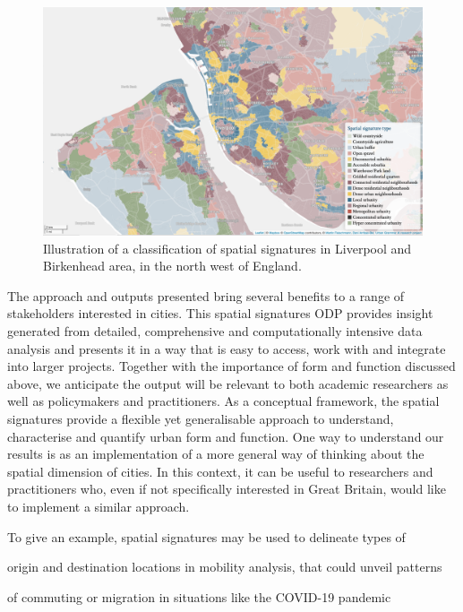 \begin{figure}
    \includegraphics[width=\linewidth]{fig/signatures_map.png}
\caption{Illustration of a classification of spatial signatures in Liverpool and
    Birkenhead area, in the north west of England.}
\label{fig:map}
\end{figure}

The approach and outputs presented bring several benefits to a range of
stakeholders interested in cities.
This spatial signatures ODP provides insight generated from detailed,
comprehensive and computationally intensive data analysis and presents it in a
way that is easy to access, work with and integrate into larger projects.
%
Together with the importance of form and function discussed above, we
anticipate the output will be relevant to both academic researchers as well as
policymakers and practitioners.
As a conceptual framework, the spatial signatures provide a flexible yet
generalisable approach to understand, characterise and quantify urban form and
function. One way to understand our results is as an implementation of a
more general way of thinking about the spatial dimension of cities. In this
context, it can be useful to researchers and practitioners who, even if not
specifically interested in Great Britain, would like to implement a similar
approach.

To give an example, spatial signatures may be used to delineate types of

origin and destination locations in mobility analysis, that could unveil patterns

of commuting or migration in situations like the COVID-19 pandemic

